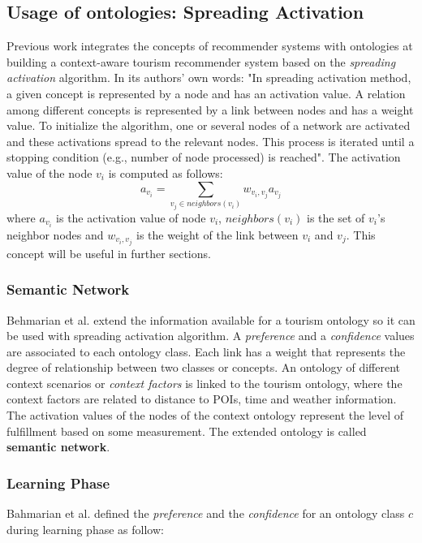 \subsection{Usage of ontologies: Spreading Activation}
Previous work \cite{bahramian_abbaspour_claramunt_2017} integrates the concepts of recommender systems with ontologies at building a context-aware tourism recommender system based on the \textit{spreading activation} algorithm. In its authors' own words: "In spreading activation method, a given concept is represented by a node and has an activation value. A relation among different concepts is represented by a link between nodes and has a weight value. To initialize the algorithm, one or several nodes of a network are activated and these activations spread to the relevant nodes. This process is iterated until a stopping condition (e.g., number of node processed) is reached". The activation value of the node \(v_i\) is computed as follows:
\begin{equation} \label{eq:og_activation}
a_{v_i} = \sum_{v_j \in neighbors(v_i)} w_{v_i, v_j} a_{v_j} 
\end{equation}
where $a_{v_i}$ is the activation value of node $v_i$, $neighbors(v_i)$ is the set of $v_i$'s neighbor nodes and $w_{v_i, v_j}$ is the weight of the link between $v_i$ and $v_j$. This concept will be useful in further sections. 

\subsubsection{Semantic Network}
Behmarian et al. \cite{bahramian_abbaspour_claramunt_2017} extend the information available for a tourism ontology so it can be used with spreading activation algorithm. A \textit{preference} and a \textit{confidence} values are associated to each ontology class. Each link has a weight that represents the degree of relationship between two classes or concepts. An ontology of different context scenarios or \textit{context factors} is linked to the tourism ontology, where the context factors are related to distance to POIs, time and weather information. The activation values of the nodes of the context ontology represent the level of fulfillment based on some measurement. The extended ontology is called \textbf{semantic network}.

\subsubsection{Learning Phase}
Bahmarian et al. \cite{bahramian_abbaspour_claramunt_2017} defined the \textit{preference} and the \textit{confidence} for an ontology class $c$ during learning phase as follow:


